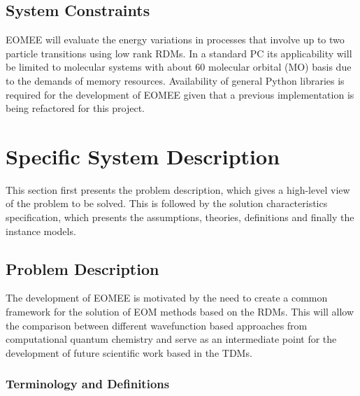 \documentclass[12pt]{article}
\begin{document}
\subsection{System Constraints}


EOMEE will evaluate the energy variations in processes that involve up 
to two particle transitions using low rank RDMs. In a standard PC its 
applicability will be limited to molecular systems with about 60 molecular 
orbital (MO) basis due to the demands of memory resources. Availability of 
general Python libraries is required for the development of EOMEE given that a 
previous implementation is being refactored for this project. 

\section{Specific System Description}

This section first presents the problem description, which gives a high-level
view of the problem to be solved.  This is followed by the solution characteristics
specification, which presents the assumptions, theories, definitions and finally
the instance models.  

\subsection{Problem Description} \label{Sec_pd}

The development of EOMEE is motivated by the need to create a common framework 
for the solution of EOM methods based on the RDMs. This will allow the 
comparison between different wavefunction based approaches from computational 
quantum chemistry and serve as an intermediate point for the development of 
future scientific work based in the TDMs.\\

\subsubsection{Terminology and  Definitions}
\end{document}
